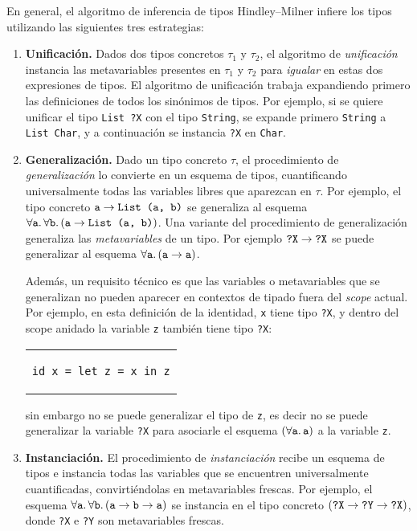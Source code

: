 \bigskip

En general, el algoritmo de inferencia de tipos Hindley--Milner
infiere los tipos utilizando las siguientes tres estrategias:
\begin{enumerate}
\item {\bf Unificación.}
  Dados dos tipos concretos $\tau_1$ y $\tau_2$,
  el algoritmo de {\em unificación} instancia
  las metavariables presentes en $\tau_1$ y $\tau_2$
  para {\em igualar} en estas dos expresiones de tipos.
  El algoritmo de unificación trabaja expandiendo primero
  las definiciones de todos los sinónimos de tipos.
  Por ejemplo, si se quiere unificar
  el tipo \verb|List ?X| con el tipo \verb|String|,
  se expande primero \verb|String| a \verb|List Char|,
  y a continuación se instancia \verb|?X| en \verb|Char|.
\item {\bf Generalización.}
  Dado un tipo concreto $\tau$,
  el procedimiento de {\em generalización}
  lo convierte en un esquema de tipos,
  cuantificando universalmente
  todas las variables libres que aparezcan en $\tau$.
  Por ejemplo,
  el tipo concreto $\verb|a| \rightarrow \verb|List (a, b)|$
  se generaliza al esquema $\forall\verb|a|.\,\forall\verb|b|.\,(\verb|a| \rightarrow \verb|List (a, b)|)$.
  Una variante del procedimiento de generalización generaliza las {\em metavariables}
  de un tipo. Por ejemplo $\verb|?X| \rightarrow \verb|?X|$
  se puede generalizar al esquema $\forall\verb|a|.\,(\verb|a| \rightarrow \verb|a|)$.

  Además, un requisito técnico es que las variables o metavariables
  que se generalizan no pueden aparecer en contextos de tipado fuera del {\em scope} actual.
  Por ejemplo, en esta definición de la identidad,
  \verb|x| tiene tipo \verb|?X|,
  y dentro del scope anidado la variable \verb|z| también tiene tipo \verb|?X|:
  \begin{center}
  \begin{tabular}{c}
  \begin{lstlisting}[mathescape=true]
id x = let z = x in z
  \end{lstlisting}
  \end{tabular}
  \end{center}
  sin embargo no se puede generalizar el tipo de \verb|z|, es decir
  no se puede generalizar la variable \verb|?X|
  para asociarle el esquema $(\forall\verb|a|.\,\verb|a|)$ a la variable \verb|z|.
\item {\bf Instanciación.}
  El procedimiento de {\em instanciación} recibe un esquema de tipos
  e instancia todas las variables que se encuentren universalmente cuantificadas,
  convirtiéndolas en metavariables frescas.
  Por ejemplo, el esquema $\forall\verb|a|.\,\forall\verb|b|.\,(\verb|a| \rightarrow \verb|b| \rightarrow \verb|a|)$
  se instancia en el tipo concreto $(\verb|?X| \rightarrow \verb|?Y| \rightarrow \verb|?X|)$,
  donde \verb|?X| e \verb|?Y| son metavariables frescas.
\end{enumerate}

